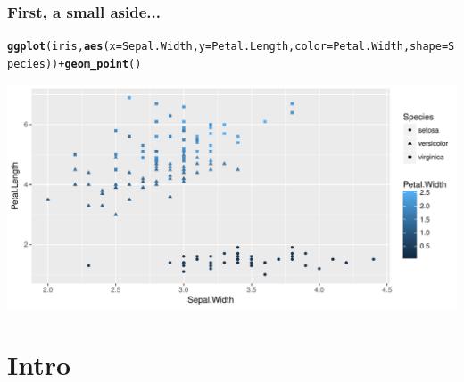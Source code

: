\documentclass{beamer}\usepackage[]{graphicx}\usepackage[]{color}
\makeatletter
\def\maxwidth{ %
  \ifdim\Gin@nat@width>\linewidth
    \linewidth
  \else
    \Gin@nat@width
  \fi
}
\newcommand{\hlopt}[1]{\textcolor[rgb]{0,0,0}{#1}}%
\newcommand{\hlstd}[1]{\textcolor[rgb]{0.345,0.345,0.345}{#1}}%
\newcommand{\hlkwc}[1]{\textcolor[rgb]{0.333,0.667,0.333}{#1}}%
\newcommand{\hlkwd}[1]{\textcolor[rgb]{0.737,0.353,0.396}{\textbf{#1}}}%
\newenvironment{kframe}{%
 \def\at@end@of@kframe{}%
 \ifinner\ifhmode%
  \def\at@end@of@kframe{\end{minipage}}%
  \begin{minipage}{\columnwidth}%
 \fi\fi%
 \def\FrameCommand##1{\hskip\@totalleftmargin \hskip-\fboxsep
 \colorbox{shadecolor}{##1}\hskip-\fboxsep
     \hskip-\linewidth \hskip-\@totalleftmargin \hskip\columnwidth}%
 \MakeFramed {\advance\hsize-\width
   \@totalleftmargin\z@ \linewidth\hsize
   \@setminipage}}%
 {\par\unskip\endMakeFramed%
 \at@end@of@kframe}
\newenvironment{knitrout}{}{} %
\makeatother
\begin{document}
\begin{frame}[fragile]
\frametitle{First, a small aside...}
\begin{knitrout}\tiny
{}\color{fgcolor}\begin{kframe}
\begin{alltt}
\hlkwd{ggplot}\hlstd{(iris,} \hlkwd{aes}\hlstd{(}\hlkwc{x}\hlstd{=Sepal.Width,} \hlkwc{y}\hlstd{=Petal.Length,} \hlkwc{color}\hlstd{=Petal.Width,} \hlkwc{shape}\hlstd{=Species))} \hlopt{+} \hlkwd{geom_point}\hlstd{()}
\end{alltt}
\end{kframe}
\includegraphics[width=\maxwidth]{figure/unnamed-chunk-3-1} 

\end{knitrout}
\end{frame}

\section{Intro}
\end{document}
